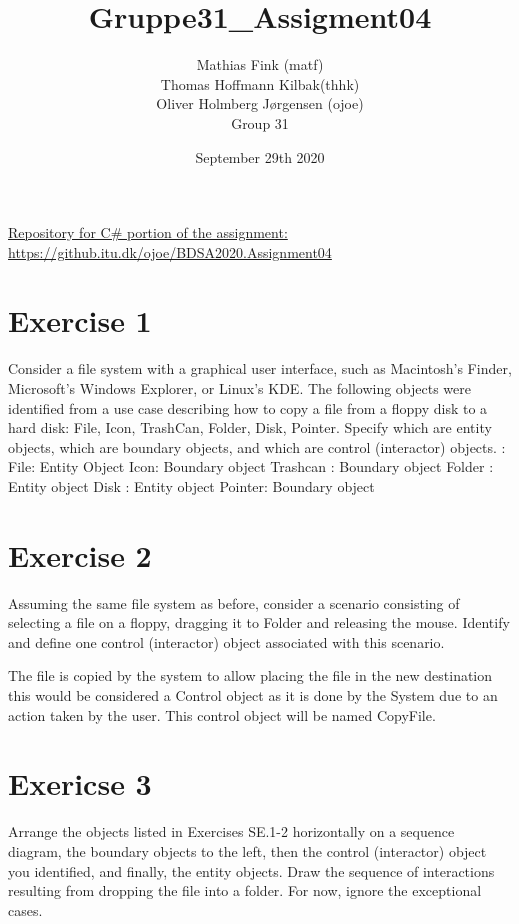 \documentclass{article}
\title{Gruppe31\_Assigment04}
\author{Mathias Fink (matf)\\ Thomas Hoffmann Kilbak(thhk)\\ Oliver Holmberg Jørgensen (ojoe)\\ Group 31}
\date{September 29th 2020}
\begin{document}
\maketitle

\noindent \href{https://github.itu.dk/ojoe/BDSA2020.Assignment04}{Repository for C\# portion of the assignment:} \\
\url{https://github.itu.dk/ojoe/BDSA2020.Assignment04}

\section{Exercise 1}
Consider a file system with a graphical user interface, such as Macintosh’s Finder, Microsoft’s Windows Explorer, or Linux’s KDE. The following objects were identified from a use case describing how to copy a file from a floppy disk to a hard disk: File, Icon, TrashCan, Folder, Disk, Pointer. Specify which are entity objects, which are boundary objects, and which are control (interactor) objects. :\newline
\newline
File: Entity Object \newline
Icon: Boundary object \newline
Trashcan : Boundary object \newline
Folder : Entity object \newline
Disk : Entity object \newline
Pointer: Boundary object

\section{Exercise 2}
Assuming the same file system as before, consider a scenario consisting of selecting a file on a floppy, dragging it to Folder and releasing the mouse. Identify and define one control (interactor) object associated with this scenario. \newline

The file is copied by the system to allow placing the file in the new destination this would be considered a Control object as it is done by the System due to an action taken by the user. \newline
This control object will be named CopyFile.

\section{Exericse 3}
Arrange the objects listed in Exercises SE.1-2 horizontally on a sequence diagram, the boundary objects to the left, then the control (interactor) object you identified, and finally, the entity objects. Draw the sequence of interactions resulting from dropping the file into a folder. For now, ignore the exceptional cases.
\end{document}
